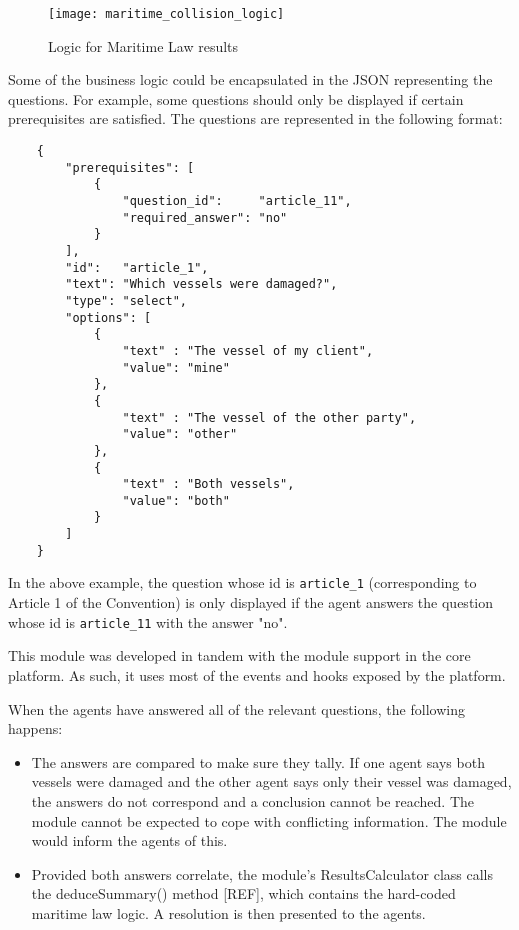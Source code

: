\begin{figure}[h!]
  \centering
    \ifimages
    \texttt{[image: maritime\_collision\_logic]}
    \fi
  \caption{Logic for Maritime Law results}
  \label{uml:maritimeLogic}
\end{figure}

Some of the business logic could be encapsulated in the JSON representing the questions. For example, some questions should only be displayed if certain prerequisites are satisfied. The questions are represented in the following format:

\begin{lstlisting}
    {
        "prerequisites": [
            {
                "question_id":     "article_11",
                "required_answer": "no"
            }
        ],
        "id":   "article_1",
        "text": "Which vessels were damaged?",
        "type": "select",
        "options": [
            {
                "text" : "The vessel of my client",
                "value": "mine"
            },
            {
                "text" : "The vessel of the other party",
                "value": "other"
            },
            {
                "text" : "Both vessels",
                "value": "both"
            }
        ]
    }
\end{lstlisting}

In the above example, the question whose id is \lstinline{article_1} (corresponding to Article 1 of the Convention) is only displayed if the agent answers the question whose id is \lstinline{article_11} with the answer "no".

This module was developed in tandem with the module support in the core platform. As such, it uses most of the events and hooks exposed by the platform.

When the agents have answered all of the relevant questions, the following happens:

\begin{itemize}
    \item The answers are compared to make sure they tally. If one agent says both vessels were damaged and the other agent says only their vessel was damaged, the answers do not correspond and a conclusion cannot be reached. The module cannot be expected to cope with conflicting information. The module would inform the agents of this.
    \item Provided both answers correlate, the module's ResultsCalculator class calls the deduceSummary() method [REF], which contains the hard-coded maritime law logic. A resolution is then presented to the agents.
\end{itemize}

